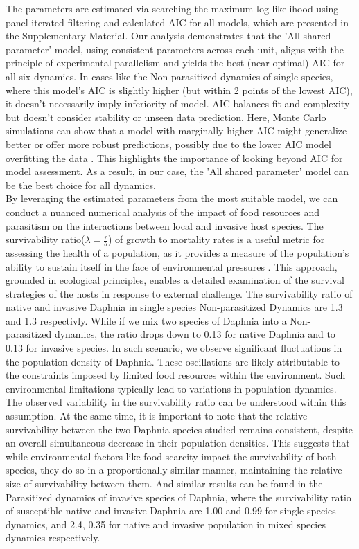\documentclass[12pt]{article}
\begin{document}
The parameters are estimated via searching the maximum log-likelihood using panel iterated filtering and calculated AIC for all models, which are presented in the Supplementary Material. Our analysis demonstrates that the 'All shared parameter' model, using consistent parameters across each unit, aligns with the principle of experimental parallelism and yields the best (near-optimal) AIC for all six dynamics. In cases like the Non-parasitized dynamics of single species, where this model's AIC is slightly higher (but within 2 points of the lowest AIC), it doesn't necessarily imply inferiority of model. AIC balances fit and complexity but doesn't consider stability or unseen data prediction. Here, Monte Carlo simulations can show that a model with marginally higher AIC might generalize better or offer more robust predictions, possibly due to the lower AIC model overfitting the data \citep{nylund2007deciding}. This highlights the importance of looking beyond AIC for model assessment. As a result, in our case, the 'All shared parameter' model can be the best choice for all dynamics.\\

By leveraging the estimated parameters from the most suitable model, we can conduct a nuanced numerical analysis of the impact of food resources and parasitism on the interactions between local and invasive host species. The survivability ratio($ \lambda = \frac{r}{\theta}$) of growth to mortality rates is a useful metric for assessing the health of a population, as it provides a measure of the population's ability to sustain itself in the face of environmental pressures \citep{ma2021unified}. This approach, grounded in ecological principles, enables a detailed examination of the survival strategies of the hosts in response to external challenge. The survivability ratio of native and invasive Daphnia in single species Non-parasitized Dynamics are 1.3 and 1.3 respectivly. While if we mix two species of Daphnia into a Non-parasitized dynamics, the ratio drops down to 0.13 for native Daphnia and to 0.13 for invasive species. In such scenario, we observe significant fluctuations in the population density of Daphnia. These oscillations are likely attributable to the constraints imposed by limited food resources within the environment. Such environmental limitations typically lead to variations in population dynamics. The observed variability in the survivability ratio can be understood within this assumption. At the same time, it is important to note that the relative survivability between the two Daphnia species studied remains consistent, despite an overall simultaneous decrease in their population densities. This suggests that while environmental factors like food scarcity impact the survivability of both species, they do so in a proportionally similar manner, maintaining the relative size of survivability between them. And similar results can be found in the Parasitized dynamics of invasive species of Daphnia, where the survivability ratio of susceptible native and invasive Daphnia are 1.00 and 0.99 for single species dynamics, and 2.4, 0.35 for native and invasive population in mixed species dynamics respectively.\\
\end{document}

